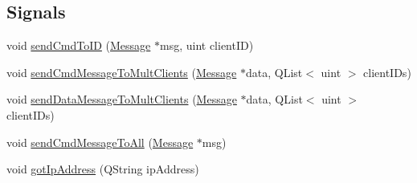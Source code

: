 \subsection*{Signals}
\begin{DoxyCompactItemize}
\item 
void \hyperlink{class_server_appl_1_1_server_ac5f8b4875da98db7628cd30b313f5ad3}{send\+Cmd\+To\+I\+D} (\hyperlink{class_message}{Message} $\ast$msg, uint client\+I\+D)
\item 
void \hyperlink{class_server_appl_1_1_server_ac1d549bb41c2de88b9a00f063612769e}{send\+Cmd\+Message\+To\+Mult\+Clients} (\hyperlink{class_message}{Message} $\ast$data, Q\+List$<$ uint $>$ client\+I\+Ds)
\item 
void \hyperlink{class_server_appl_1_1_server_af15bcdad44457e23861b04e57b049dcd}{send\+Data\+Message\+To\+Mult\+Clients} (\hyperlink{class_message}{Message} $\ast$data, Q\+List$<$ uint $>$ client\+I\+Ds)
\item 
void \hyperlink{class_server_appl_1_1_server_aec12f26df6da0373db5b54e60fc0f20a}{send\+Cmd\+Message\+To\+All} (\hyperlink{class_message}{Message} $\ast$msg)
\item 
void \hyperlink{class_server_appl_1_1_server_a75584f109e945b3f55d3de9605a89a34}{got\+Ip\+Address} (Q\+String ip\+Address)
\end{DoxyCompactItemize}
